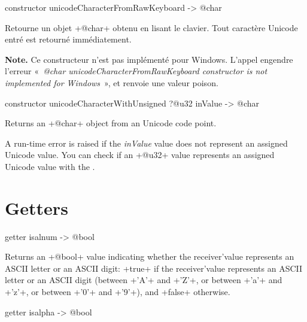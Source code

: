 
\begin{galgas4}
constructor unicodeCharacterFromRawKeyboard -> @char
\end{galgas4}


Retourne un objet \ggsq+@char+ obtenu en lisant le clavier. Tout caractère Unicode entré est retourné immédiatement.

{\bf Note.} Ce constructeur n'est pas implémenté pour Windows. L'appel engendre l'erreur «~\emph{@char unicodeCharacterFromRawKeyboard constructor is not implemented for Windows}~», et renvoie une valeur poison.







\begin{galgas4}
constructor unicodeCharacterWithUnsigned ?@u32 inValue -> @char
\end{galgas4}


Returns an \ggsq+@char+ object from an Unicode code point.

A run-time error is raised if the \emph{inValue} value does not represent an assigned Unicode value. You can check if an \ggsq+@u32+ value represents an assigned Unicode value with the .


\section{Getters}



\begin{galgas4}
getter isalnum -> @bool
\end{galgas4}

Returns an \ggsq+@bool+ value indicating whether the receiver'value represents an ASCII letter or an ASCII digit: \ggsq+true+ if the receiver'value represents an ASCII letter or an ASCII digit (between \ggsq+'A'+ and \ggsq+'Z'+, or between \ggsq+'a'+ and \ggsq+'z'+, or between \ggsq+'0'+ and \ggsq+'9'+), and \ggsq+false+ otherwise.





\begin{galgas4}
getter isalpha -> @bool
\end{galgas4}

